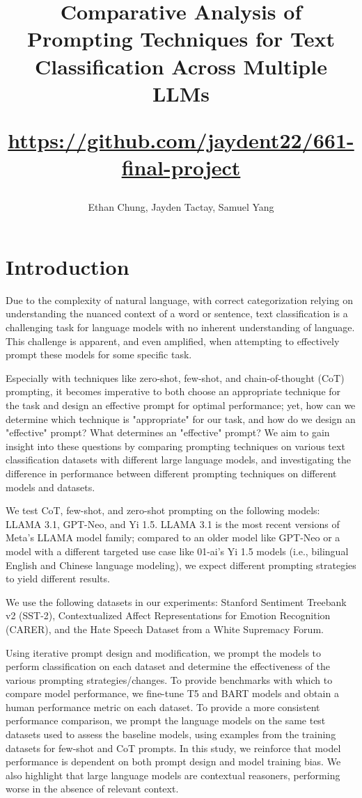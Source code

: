 \documentclass[twocolumn]{article}
\title{Comparative Analysis of Prompting Techniques for Text Classification Across Multiple LLMs \\ \begin{small}\url{https://github.com/jaydent22/661-final-project}\end{small}}
\author{Ethan Chung, Jayden Tactay, Samuel Yang}
\date{}
\begin{document}
\maketitle

\section{Introduction}

Due to the complexity of natural language, with correct categorization relying on understanding the nuanced context of a word or sentence, text classification is a challenging task for language models with no inherent understanding of language. This challenge is apparent, and even amplified, when attempting to effectively prompt these models for some specific task.

Especially with techniques like zero-shot, few-shot, and chain-of-thought (CoT) prompting, it becomes imperative to both choose an appropriate technique for the task and design an effective prompt for optimal performance; yet, how can we determine which technique is "appropriate" for our task, and how do we design an "effective" prompt? What determines an "effective" prompt? We aim to gain insight into these questions by comparing prompting techniques on various text classification datasets with different large language models, and investigating the difference in performance between different prompting techniques on different models and datasets.

We test CoT, few-shot, and zero-shot prompting on the following models: LLAMA 3.1, GPT-Neo, and Yi 1.5. LLAMA 3.1 is the most recent versions of Meta’s LLAMA model family; compared to an older model like GPT-Neo or a model with a different targeted use case like 01-ai’s Yi 1.5 models (i.e., bilingual English and Chinese language modeling), we expect different prompting strategies to yield different results.

We use the following datasets in our experiments: Stanford Sentiment Treebank v2 (SST-2), Contextualized Affect Representations for Emotion Recognition (CARER), and the Hate Speech Dataset from a White Supremacy Forum.

Using iterative prompt design and modification, we prompt the models to perform classification on each dataset and determine the effectiveness of the various prompting strategies/changes. To provide benchmarks with which to compare model performance, we fine-tune T5 and BART models and obtain a human performance metric on each dataset. To provide a more consistent performance comparison, we prompt the language models on the same test datasets used to assess the baseline models, using examples from the training datasets for few-shot and CoT prompts. In this study, we reinforce that model performance is dependent on both prompt design and model training bias. We also highlight that large language models are contextual reasoners, performing worse in the absence of relevant context.
\end{document}
